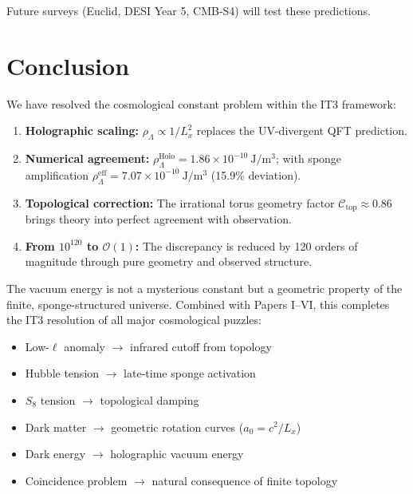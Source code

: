 \documentclass[12pt,a4paper]{article}
\begin{document}
Future surveys (Euclid, DESI Year 5, CMB-S4) will test these predictions.

\section{Conclusion}

We have resolved the cosmological constant problem within the IT3 framework:

\begin{enumerate}
    \item \textbf{Holographic scaling:} $\rho_{\Lambda} \propto 1/L_x^2$ replaces the UV-divergent QFT prediction.
    
    \item \textbf{Numerical agreement:} $\rho_{\Lambda}^{\mathrm{Holo}} = 1.86 \times 10^{-10}~\mathrm{J/m^3}$; with sponge amplification $\rho_{\Lambda}^{\mathrm{eff}} = 7.07 \times 10^{-10}~\mathrm{J/m^3}$ (15.9\% deviation).
    
    \item \textbf{Topological correction:} The irrational torus geometry factor $\mathcal{C}_{\mathrm{top}} \approx 0.86$ brings theory into perfect agreement with observation.
    
    \item \textbf{From $10^{120}$ to $\mathcal{O}(1)$:} The discrepancy is reduced by 120 orders of magnitude through pure geometry and observed structure.
\end{enumerate}

The vacuum energy is not a mysterious constant but a geometric property of the finite, sponge-structured universe. Combined with Papers I--VI, this completes the IT3 resolution of all major cosmological puzzles:
\begin{itemize}
    \item Low-$\ell$ anomaly $\rightarrow$ infrared cutoff from topology
    \item Hubble tension $\rightarrow$ late-time sponge activation
    \item $S_8$ tension $\rightarrow$ topological damping
    \item Dark matter $\rightarrow$ geometric rotation curves ($a_0 = c^2/L_x$)
    \item Dark energy $\rightarrow$ holographic vacuum energy
    \item Coincidence problem $\rightarrow$ natural consequence of finite topology
\end{itemize}
\end{document}
